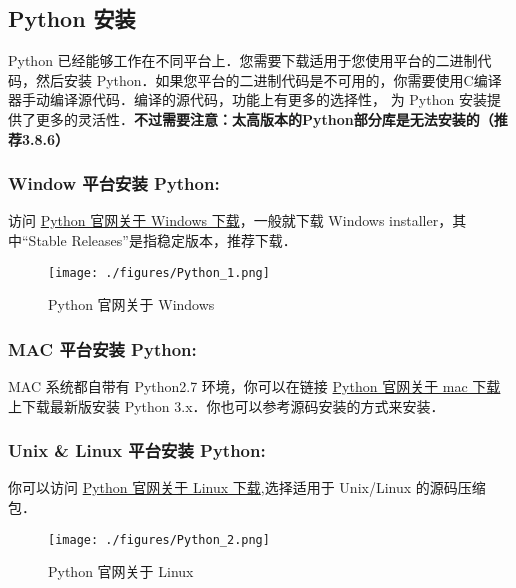 

\subsection{Python 安装}
Python 已经能够工作在不同平台上．您需要下载适用于您使用平台的二进制代码，然后安装 Python．如果您平台的二进制代码是不可用的，你需要使用C编译器手动编译源代码．编译的源代码，功能上有更多的选择性， 为 Python 安装提供了更多的灵活性．\textbf{不过需要注意：太高版本的Python部分库是无法安装的（推荐3.8.6）}

\subsubsection{Window 平台安装 Python:}
访问 \href{https://www.python.org/downloads/windows/}{Python 官网关于 Windows 下载}，一般就下载  Windows installer，其中“Stable Releases”是指稳定版本，推荐下载．
\begin{figure}[ht]
\centering
\texttt{[image: ./figures/Python\_1.png]}
\caption{Python 官网关于 Windows} \label{Python_fig1}
\end{figure}

\subsubsection{MAC 平台安装 Python:}
MAC 系统都自带有 Python2.7 环境，你可以在链接 \href{https://www.python.org/downloads/mac-osx/}{Python 官网关于 mac 下载} 上下载最新版安装 Python 3.x．你也可以参考源码安装的方式来安装．

\subsubsection{Unix & Linux 平台安装 Python:}
你可以访问 \href{https://www.python.org/downloads/source/}{Python 官网关于 Linux 下载},选择适用于 Unix/Linux 的源码压缩包．
\begin{figure}[ht]
\centering
\texttt{[image: ./figures/Python\_2.png]}
\caption{Python 官网关于 Linux} \label{Python_fig2}
\end{figure}


